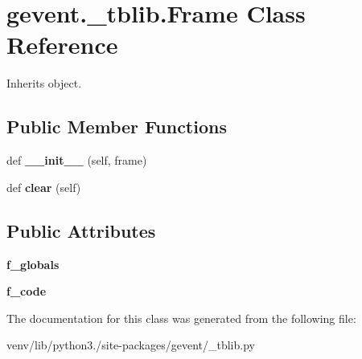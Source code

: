 \hypertarget{classgevent_1_1__tblib_1_1_frame}{}\section{gevent.\+\_\+tblib.\+Frame Class Reference}
\label{classgevent_1_1__tblib_1_1_frame}


Inherits object.

\subsection*{Public Member Functions}
\begin{DoxyCompactItemize}
\item 
\mbox{\label{classgevent_1_1__tblib_1_1_frame_a521db4573cc99b2cbb5c5568034d42b9}} 
def {\bfseries \+\_\+\+\_\+init\+\_\+\+\_\+} (self, frame)
\item 
\mbox{\label{classgevent_1_1__tblib_1_1_frame_a02a455f0f907610f23be4a8101bb22ed}} 
def {\bfseries clear} (self)
\end{DoxyCompactItemize}
\subsection*{Public Attributes}
\begin{DoxyCompactItemize}
\item 
\mbox{\label{classgevent_1_1__tblib_1_1_frame_a54a9dbacffe421c6d3ff9c73233a4f2d}} 
{\bfseries f\+\_\+globals}
\item 
\mbox{\label{classgevent_1_1__tblib_1_1_frame_ac19aa6a8a235cb0e751f50cff413e851}} 
{\bfseries f\+\_\+code}
\end{DoxyCompactItemize}


The documentation for this class was generated from the following file\+:\begin{DoxyCompactItemize}
\item 
venv/lib/python3./site-\/packages/gevent/\+\_\+tblib.\+py\end{DoxyCompactItemize}
